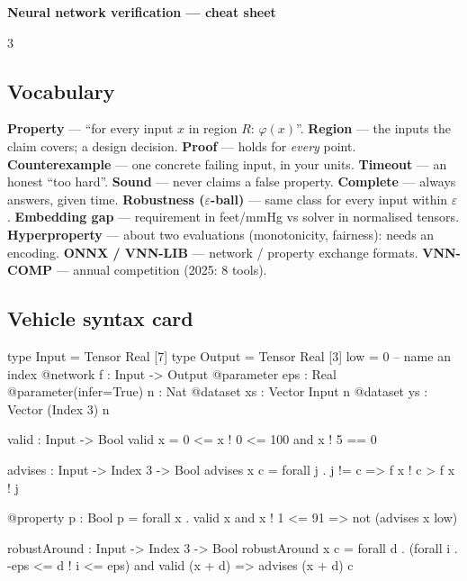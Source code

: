 \documentclass[10pt]{article}
\begin{document}
{\bpdisplay\bfseries\LARGE\color{bpInk}Neural network verification — cheat sheet}\par{}\vspace{2mm}
\begin{multicols}{3}\footnotesize
\subsection*{Vocabulary}
\textbf{Property} — ``for every input $x$ in region $R$: $\varphi(x)$''. \textbf{Region} — the inputs the claim covers; a design decision. \textbf{Proof} — holds for \emph{every} point. \textbf{Counterexample} — one concrete failing input, in your units. \textbf{Timeout} — an honest ``too hard''. \textbf{Sound} — never claims a false property. \textbf{Complete} — always answers, given time. \textbf{Robustness ($\varepsilon$-ball)} — same class for every input within $\varepsilon$. \textbf{Embedding gap} — requirement in feet/mmHg vs solver in normalised tensors. \textbf{Hyperproperty} — about two evaluations (monotonicity, fairness): needs an encoding. \textbf{ONNX / VNN-LIB} — network / property exchange formats. \textbf{VNN-COMP} — annual competition (2025: 8 tools).

\subsection*{Vehicle syntax card}
\begin{vclbox}
type Input  = Tensor Real [7]
type Output = Tensor Real [3]
low = 0          -- name an index
@network
f : Input -> Output
@parameter
eps : Real
@parameter(infer=True)
n : Nat
@dataset
xs : Vector Input n
@dataset
ys : Vector (Index 3) n
\end{vclbox}
\begin{vclbox}
valid : Input -> Bool
valid x = 0 <= x ! 0 <= 100 and x ! 5 == 0

advises : Input -> Index 3 -> Bool
advises x c = forall j . j != c =>
                 f x ! c > f x ! j

@property
p : Bool
p = forall x . valid x and x ! 1 <= 91
      => not (advises x low)

robustAround : Input -> Index 3 -> Bool
robustAround x c = forall d .
  (forall i . -eps <= d ! i <= eps)
  and valid (x + d) => advises (x + d) c


\end{vclbox}
\end{multicols}
\end{document}
